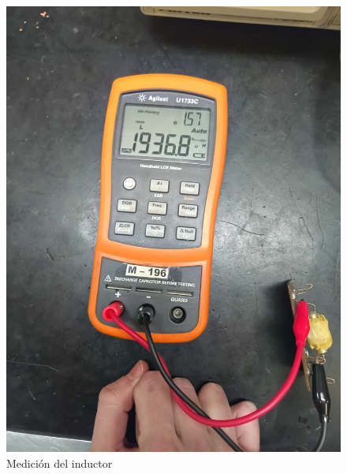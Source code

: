 \begin{figure}[H]
\begin{minipage}{0.49\textwidth}
    \includegraphics[width=\textwidth]{Imagenes/MedIndExp3.jpeg}
    \caption{Medición del inductor}
    \end{minipage}
\end{figure}